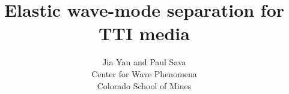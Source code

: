 \title{Elastic wave-mode separation for TTI media}
\author{Jia Yan and Paul Sava \\ 
Center for Wave Phenomena \\ 
Colorado School of Mines}


\maketitle







     
 
        
     
   
  




